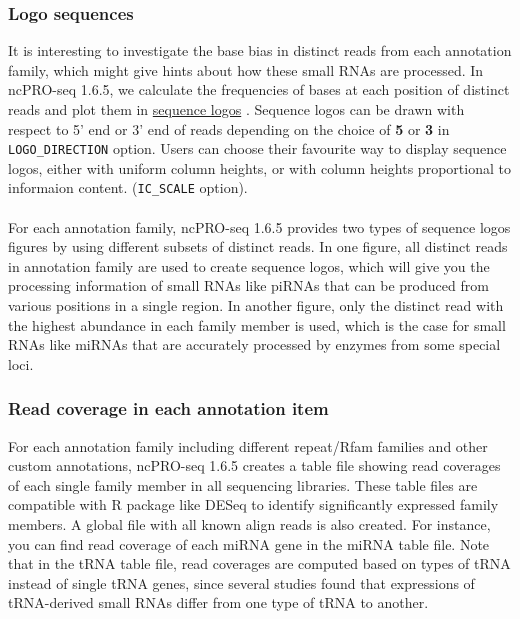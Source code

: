 \documentclass[12pt]{article}
\def \ncpip{ncPRO-seq 1.6.5}
\begin{document}
\subsubsection{Logo sequences}
\label{subsubsection:logo}
It is interesting to investigate the base bias in distinct reads from each annotation family, which might give hints about how these small RNAs are processed. In \ncpip{}, we calculate the frequencies of bases at each position of distinct reads and plot them in \href{http://www.bioconductor.org/packages/2.2/bioc/html/seqLogo.html}{ sequence logos} \cite{OliverseqLogo}. Sequence logos can be drawn with respect to 5' end or 3' end of reads depending on the choice of \textbf{5} or \textbf{3} in \verb+LOGO_DIRECTION+ option. Users can choose their favourite way to display sequence logos, either with uniform column heights, or with column heights proportional to informaion content. (\verb+IC_SCALE+ option). \\\\
For each annotation family, \ncpip{} provides two types of sequence logos figures by using different subsets of distinct reads. In one figure, all distinct reads in annotation family are used to create sequence logos, which will give you the processing information of small RNAs like piRNAs that can be produced from various positions in a single region. In another figure, only the distinct read with the highest abundance in each family member is used, which is the case for small RNAs like miRNAs that are accurately processed by enzymes from some special loci. 

\subsubsection{Read coverage in each annotation item}
For each annotation family including different repeat/Rfam families and other custom annotations, \ncpip{} creates a table file showing read coverages of each single family member in all sequencing libraries. These table files are compatible with R package like DESeq \cite{Simon2010} to identify significantly expressed family members. A global file with all known align reads is also created. For instance, you can find read coverage of each miRNA gene in the miRNA table file. Note that in the tRNA table file, read coverages are computed based on types of tRNA instead of single tRNA genes, since several studies found that expressions of tRNA-derived small RNAs differ from one type of tRNA to another.
\end{document}
